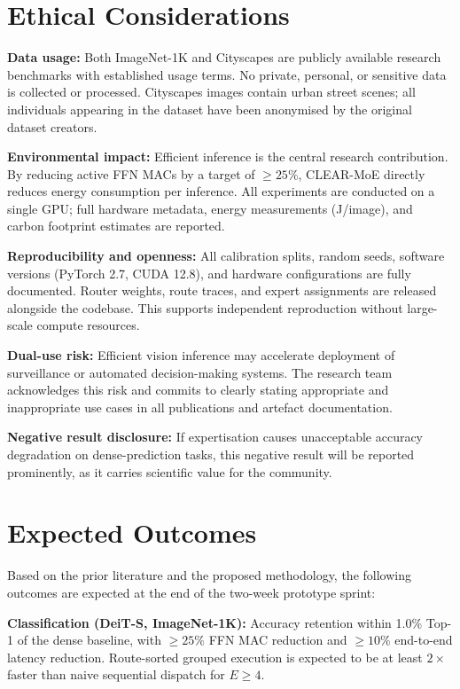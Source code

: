 \documentclass[conference]{IEEEtran}
\begin{document}
\section{Ethical Considerations}
\label{sec:ethics}

\textbf{Data usage:} Both ImageNet-1K \cite{russakovsky2015imagenet} and Cityscapes \cite{cordts2016cityscapes} are publicly available research benchmarks with established usage terms. No private, personal, or sensitive data is collected or processed. Cityscapes images contain urban street scenes; all individuals appearing in the dataset have been anonymised by the original dataset creators.

\textbf{Environmental impact:} Efficient inference is the central research contribution. By reducing active FFN MACs by a target of $\geq 25\%$, CLEAR-MoE directly reduces energy consumption per inference. All experiments are conducted on a single GPU; full hardware metadata, energy measurements (J/image), and carbon footprint estimates are reported.

\textbf{Reproducibility and openness:} All calibration splits, random seeds, software versions (PyTorch 2.7, CUDA 12.8), and hardware configurations are fully documented. Router weights, route traces, and expert assignments are released alongside the codebase. This supports independent reproduction without large-scale compute resources.

\textbf{Dual-use risk:} Efficient vision inference may accelerate deployment of surveillance or automated decision-making systems. The research team acknowledges this risk and commits to clearly stating appropriate and inappropriate use cases in all publications and artefact documentation.

\textbf{Negative result disclosure:} If expertisation causes unacceptable accuracy degradation on dense-prediction tasks, this negative result will be reported prominently, as it carries scientific value for the community.

\section{Expected Outcomes}
\label{sec:outcomes}

Based on the prior literature and the proposed methodology, the following outcomes are expected at the end of the two-week prototype sprint:

\textbf{Classification (DeiT-S, ImageNet-1K):} Accuracy retention within 1.0\% Top-1 of the dense baseline, with $\geq 25\%$ FFN MAC reduction and $\geq 10\%$ end-to-end latency reduction. Route-sorted grouped execution is expected to be at least $2\times$ faster than naive sequential dispatch for $E \geq 4$.
\end{document}
